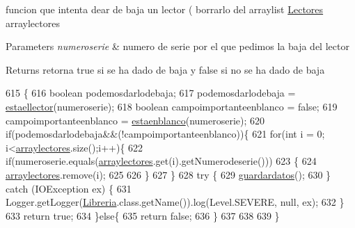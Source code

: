 funcion que intenta dear de baja un lector ( borrarlo del arraylist \mbox{\hyperlink{classlibreria_1_1_lectores}{Lectores}} arraylectores 
\begin{DoxyParams}{Parameters}
{\em numeroserie} & numero de serie por el que pedimos la baja del lector \\
\hline
\end{DoxyParams}
\begin{DoxyReturn}{Returns}
retorna true si se ha dado de baja y false si no se ha dado de baja 
\end{DoxyReturn}

\begin{DoxyCode}
615                                                               \{
616          \textcolor{keywordtype}{boolean} podemosdarlodebaja;
617          podemosdarlodebaja = \mbox{\hyperlink{classlibreria_1_1_libreria_a1d272b2c2f64bbeaa6e24f4f8c5ba2e7}{estaellector}}(numeroserie);
618          \textcolor{keywordtype}{boolean} campoimportanteenblanco = \textcolor{keyword}{false};
619          campoimportanteenblanco = \mbox{\hyperlink{classlibreria_1_1_libreria_afca98a0ea16507ff5cc9bc0dde706abb}{estaenblanco}}(numeroserie);
620          \textcolor{keywordflow}{if}(podemosdarlodebaja&&(!campoimportanteenblanco))\{
621             \textcolor{keywordflow}{for}(\textcolor{keywordtype}{int} i = 0; i<\mbox{\hyperlink{classlibreria_1_1_libreria_ac9e002dcb370eb6caa314d18cf14a293}{arraylectores}}.size();i++)\{
622                 \textcolor{keywordflow}{if}(numeroserie.equals(\mbox{\hyperlink{classlibreria_1_1_libreria_ac9e002dcb370eb6caa314d18cf14a293}{arraylectores}}.get(i).getNumerodeserie()))
623                 \{
624                     \mbox{\hyperlink{classlibreria_1_1_libreria_ac9e002dcb370eb6caa314d18cf14a293}{arraylectores}}.remove(i);
625                     
626                 \}
627             \}
628             \textcolor{keywordflow}{try} \{
629                      \mbox{\hyperlink{classlibreria_1_1_libreria_abc10249e70e74a9ba55a081bbf23cfcd}{guardardatos}}();
630                  \} \textcolor{keywordflow}{catch} (IOException ex) \{
631                      Logger.getLogger(\mbox{\hyperlink{classlibreria_1_1_libreria_a93220dd4de47ee3b7ef4b2a90701c253}{Libreria}}.class.getName()).log(Level.SEVERE, null, ex);
632                  \}
633             \textcolor{keywordflow}{return} \textcolor{keyword}{true};
634         \}\textcolor{keywordflow}{else}\{
635             \textcolor{keywordflow}{return} \textcolor{keyword}{false};
636         \}
637          
638          
639      \}
\end{DoxyCode}
\mbox{\label{classlibreria_1_1_libreria_adea7dde2dd160bf72da7a33b981dbf8f}} 
